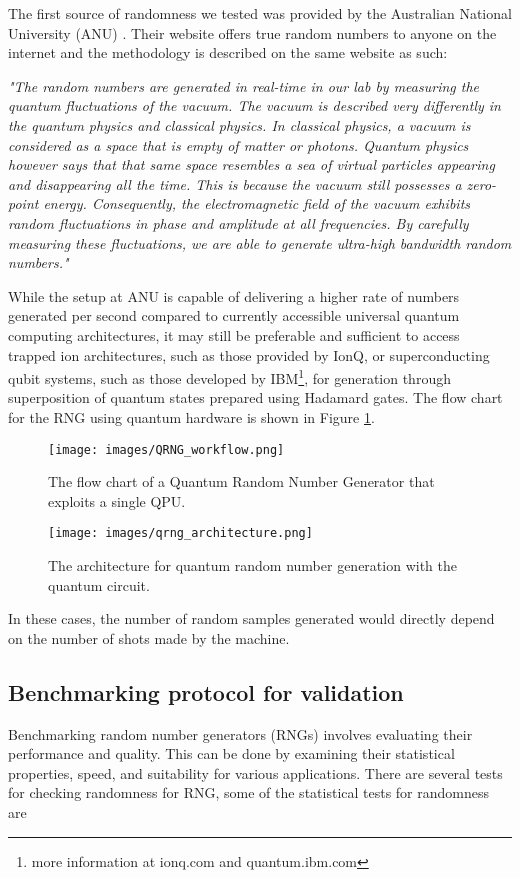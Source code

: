 \documentclass{article}
\begin{document}
The first source of randomness we tested was provided by the Australian National University (ANU) \cite{anu_url}. 
Their website offers true random numbers to anyone on the internet and the methodology is described on the same website as such: 

\textit{"The random numbers are generated in real-time in our lab by measuring the quantum fluctuations of the vacuum. 
The vacuum is described very differently in the quantum physics and classical physics. 
In classical physics, a vacuum is considered as a space that is empty of matter or photons. 
Quantum physics however says that that same space resembles a sea of virtual particles appearing and disappearing all the time. This is because the vacuum still possesses a zero-point energy. 
Consequently, the electromagnetic field of the vacuum exhibits random fluctuations in phase and amplitude at all frequencies. By carefully measuring these fluctuations, we are able to generate ultra-high bandwidth random numbers."}

While the setup at ANU is capable of delivering a higher rate of numbers generated per second compared to currently accessible universal quantum computing architectures, it may still be preferable and sufficient to access trapped ion architectures, such as those provided by IonQ, or superconducting qubit systems, such as those developed by IBM\footnote{more information at ionq.com and quantum.ibm.com}, for generation through superposition of quantum states prepared using Hadamard gates.  The flow chart for the RNG using quantum hardware is shown in Figure \ref{mc_4}.

\begin{figure}[!ht]
    \centering
    \texttt{[image: images/QRNG\_workflow.png]}
    \caption{The flow chart of a Quantum Random Number Generator that exploits a single QPU.}
    \label{mc_4}
\end{figure}

\begin{figure}[!ht]
    \centering
    \texttt{[image: images/qrng\_architecture.png]}
    \caption{The architecture for quantum random number generation with the quantum circuit.}
    \label{mc_5}
\end{figure}


In these cases, the number of random samples generated would directly depend on the number of shots made by the machine.
\subsection{Benchmarking protocol for validation}
Benchmarking random number generators (RNGs) involves evaluating their performance and quality. This can be done by examining their statistical properties, speed, and suitability for various applications.  There are several tests for checking randomness for RNG, some of the statistical tests for randomness are
\end{document}
